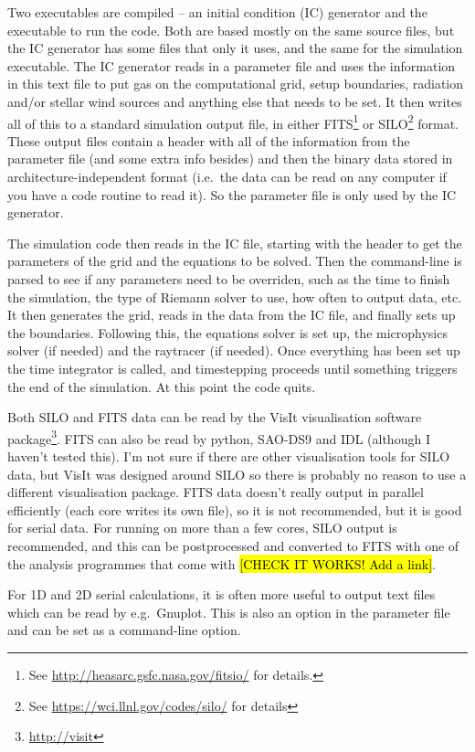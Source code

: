 \documentclass[a4paper,11pt]{report}
\begin{document}
Two executables are compiled -- an initial condition (IC) generator and the executable to run the code.
Both are based mostly on the same source files, but the IC generator has some files that only it uses, and the same for the simulation executable.
The IC generator reads in a parameter file and uses the information in this text file to put gas on the computational grid, setup boundaries, radiation and/or stellar wind sources and anything else that needs to be set.
It then writes all of this to a standard simulation output file, in either FITS\footnote{See \url{http://heasarc.gsfc.nasa.gov/fitsio/} for details.} or SILO\footnote{See \url{https://wci.llnl.gov/codes/silo/} for details} format.
These output files contain a header with all of the information from the parameter file (and some extra info besides) and then the binary data stored in architecture-independent format (i.e.\ the data can be read on any computer if you have a code routine to read it).
So the parameter file is only used by the IC generator.

The simulation code then reads in the IC file, starting with the header to get the parameters of the grid and the equations to be solved.
Then the command-line is parsed to see if any parameters need to be overriden, such as the time to finish the simulation, the type of Riemann solver to use, how often to output data, etc.
It then generates the grid, reads in the data from the IC file, and finally sets up the boundaries.
Following this, the equations solver is set up, the microphysics solver (if needed) and the raytracer (if needed).
Once everything has been set up the time integrator is called, and timestepping proceeds until something triggers the end of the simulation.
At this point the code quits.


Both SILO and FITS data can be read by the VisIt visualisation software package\footnote{\url{http://visit}}.
FITS can also be read by python, SAO-DS9 and IDL (although I haven't tested this).
I'm not sure if there are other visualisation tools for SILO data, but VisIt was designed around SILO so there is probably no reason to use a different visualisation package.
FITS data doesn't really output in parallel efficiently (each core writes its own file), so it is not recommended, but it is good for serial data.
For running on more than a few cores, SILO output is recommended, and this can be postprocessed and converted to FITS with one of the analysis programmes that come with \pion{} \hl{[CHECK IT WORKS!  Add a link]}.

For 1D and 2D serial calculations, it is often more useful to output text files which can be read by e.g.\ Gnuplot.
This is also an option in the parameter file and can be set as a command-line option.
\end{document}
